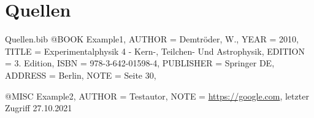 \section{Quellen}
\renewcommand{\refname}{}   %



\begin{filecontents}{Quellen.bib}
@BOOK
{
    Example1,
	AUTHOR = {Demtröder, W.},
	YEAR = {2010},
	TITLE = {Experimentalphysik 4 - Kern-, Teilchen- Und Astrophysik},
	EDITION = {3. Edition},
	ISBN = {978-3-642-01598-4},
	PUBLISHER = {Springer DE},
	ADDRESS = {Berlin},
    NOTE = {Seite 30},
}

@MISC
{
    Example2,
	AUTHOR = {Testautor},
    NOTE = {\url{https://google.com}, letzter Zugriff 27.10.2021}
}
\end{filecontents}